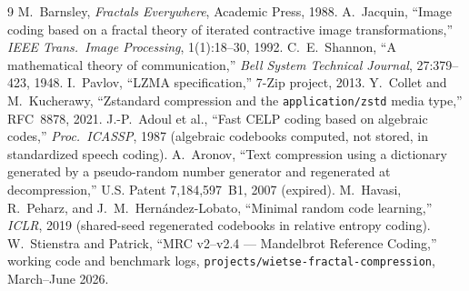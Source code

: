 \documentclass[11pt,a4paper]{article}
\begin{document}
\begin{thebibliography}{9}
\small
{} M.~Barnsley, \emph{Fractals Everywhere}, Academic Press, 1988.
 A.~Jacquin, ``Image coding based on a fractal theory of
iterated contractive image transformations,'' \emph{IEEE Trans.\ Image
Processing}, 1(1):18--30, 1992.
 C.~E.~Shannon, ``A mathematical theory of communication,''
\emph{Bell System Technical Journal}, 27:379--423, 1948.
 I.~Pavlov, ``LZMA specification,'' 7-Zip project, 2013.
 Y.~Collet and M.~Kucherawy, ``Zstandard compression and the
\texttt{application/zstd} media type,'' RFC~8878, 2021.
 J.-P.~Adoul et al., ``Fast CELP coding based on algebraic
codes,'' \emph{Proc.\ ICASSP}, 1987 (algebraic codebooks computed, not stored,
in standardized speech coding).
 A.~Aronov, ``Text compression using a dictionary generated by
a pseudo-random number generator and regenerated at decompression,'' U.S.
Patent 7{,}184{,}597~B1, 2007 (expired).
 M.~Havasi, R.~Peharz, and J.~M.~Hern\'andez-Lobato, ``Minimal
random code learning,'' \emph{ICLR}, 2019 (shared-seed regenerated codebooks
in relative entropy coding).
 W.~Stienstra and Patrick, ``MRC v2--v2.4 --- Mandelbrot Reference Coding,''
working code and benchmark logs, \texttt{projects/wietse-fractal-compression},
March--June 2026.
\end{thebibliography}
\end{document}
